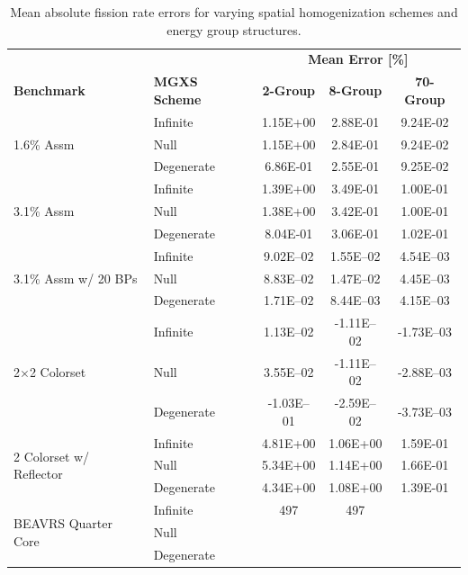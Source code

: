 \begin{table}[h!]
  \centering
  \caption[Mean OpenMOC fission rate errors]{Mean absolute fission rate errors for varying spatial homogenization schemes and energy group structures.}
  \small
  \label{table:chap8-openmoc-mean-fiss-rates}
  \vspace{6pt}
  \begin{tabular}{l l c c c}
  \toprule
  \rowcolor{lightgray}
  & & \multicolumn{3}{c}{\cellcolor{lightgray} \textbf{Mean Error [\%]}} \\
  \multirow{-2}{*}{\cellcolor{lightgray} \bf Benchmark} &
  \multirow{-2}{*}{\cellcolor{lightgray} \bf \ac{MGXS} Scheme} &
  \multicolumn{1}{c}{{\cellcolor{lightgray} \bf 2-Group}} &
  \multicolumn{1}{c}{{\cellcolor{lightgray} \bf 8-Group}} &
  \multicolumn{1}{c}{{\cellcolor{lightgray} \bf 70-Group}} \\
  \midrule
\multirow{3}{*}{\parbox{2.5cm}{1.6\% Assm}} & Infinite & 1.15E+00 & 2.88E-01 & 9.24E-02 \\
& Null & 1.15E+00 & 2.84E-01 & 9.24E-02 \\
& Degenerate & 6.86E-01 & 2.55E-01 & 9.25E-02 \\
  \midrule
\multirow{3}{*}{\parbox{2.5cm}{3.1\% Assm}} & Infinite & 1.39E+00 & 3.49E-01 & 1.00E-01 \\
& Null & 1.38E+00 & 3.42E-01 & 1.00E-01 \\
& Degenerate & 8.04E-01 & 3.06E-01 & 1.02E-01 \\
  \midrule
\multirow{3}{*}{\parbox{2.5cm}{3.1\% Assm w/ 20 BPs}} & Infinite & 9.02E--02 & 1.55E--02 & 4.54E--03 \\
& Null & 8.83E--02 & 1.47E--02 & 4.45E--03 \\
& Degenerate & 1.71E--02 & 8.44E--03 & 4.15E--03 \\
  \midrule
\multirow{3}{*}{\parbox{2.5cm}{2$\times$2 Colorset}} & Infinite & 1.13E--02 & -1.11E--02 & -1.73E--03 \\
& Null & 3.55E--02 & -1.11E--02 & -2.88E--03 \\
& Degenerate & -1.03E--01 & -2.59E--02 & -3.73E--03 \\
  \midrule
\multirow{3}{*}{\parbox{2.5cm}{2 Colorset w/ Reflector}} & Infinite & 4.81E+00 & 1.06E+00 & 1.59E-01 \\
& Null & 5.34E+00 & 1.14E+00 & 1.66E-01 \\
& Degenerate & 4.34E+00 & 1.08E+00 & 1.39E-01 \\
  \midrule
  \multirow{3}{*}{\parbox{2cm}{\ac{BEAVRS} Quarter Core}} & Infinite & 497 & 497 & \\
  & Null & & & \\
  & Degenerate & & & \\
  \bottomrule
\end{tabular}
\end{table}

